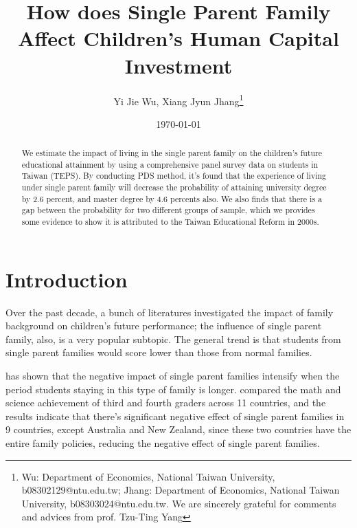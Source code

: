 \documentclass[]{AEA}
\begin{document}
\title{How does Single Parent Family Affect Children's Human Capital Investment}
\author{Yi Jie Wu, Xiang Jyun Jhang\thanks{Wu: Department of Economics, National Taiwan University, b08302129@ntu.edu.tw; Jhang: Department of Economics, National Taiwan University, b08303024@ntu.edu.tw.  We are sincerely grateful for comments and advices from prof. Tzu-Ting Yang}}
\date{\today}

\begin{abstract}
    We estimate the impact of living in the single parent family on the children's future educational attainment by using a comprehensive panel survey data on students in Taiwan (TEPS).  By conducting PDS method, it's found that the experience of living under single parent family will decrease the probability of attaining university degree by 2.6 percent, and master degree by 4.6 percents also.  We also finds that there is a gap between the probability for two different groups of sample, which we provides some evidence to show it is attributed to the Taiwan Educational Reform in 2000s.
\end{abstract}


\maketitle

\section{Introduction}

    Over the past decade, a bunch of literatures investigated the impact of family background on children's future performance; the influence of single parent family, also, is a very popular subtopic. The general trend is that students from single parent families would score lower than those from normal families.\citep{barajas2011} 

    \cite{krein1988} has shown that the negative impact of single parent families intensify when the period students staying in this type of family is longer. \cite{pong2003} compared the math and science achievement of third and fourth graders across 11 countries, and the results indicate that there's significant negative effect of single parent families in 9 countries, except Australia and New Zealand, since these two countries have the entire family policies, reducing the negative effect of single parent families.
\end{document}
